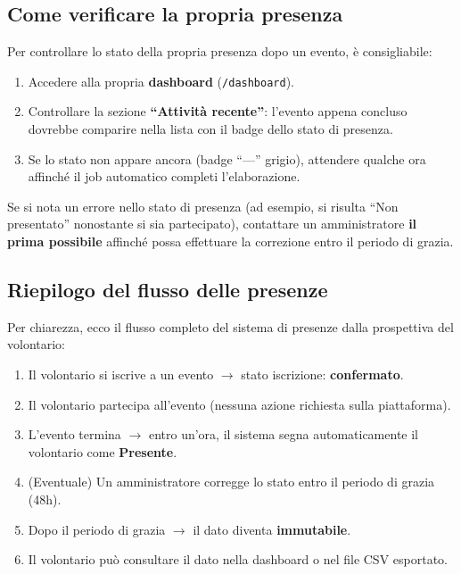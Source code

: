\documentclass[a4paper,11pt,oneside]{book}
\newcommand{\percorso}[1]{\textcolor{namoCyan}{\texttt{#1}}}
\begin{document}
\subsection{Come verificare la propria presenza}

Per controllare lo stato della propria presenza dopo un evento, \`e consigliabile:

\begin{enumerate}[leftmargin=1.5em]
  \item Accedere alla propria \textbf{dashboard} (\percorso{/dashboard}).
  \item Controllare la sezione \textbf{``Attivit\`a recente''}: l'evento appena concluso dovrebbe comparire nella lista con il badge dello stato di presenza.
  \item Se lo stato non appare ancora (badge ``---'' grigio), attendere qualche ora affinch\'e il job automatico completi l'elaborazione.
\end{enumerate}

\begin{tipbox}
Se si nota un errore nello stato di presenza (ad esempio, si risulta ``Non presentato'' nonostante si sia partecipato), contattare un amministratore \textbf{il prima possibile} affinch\'e possa effettuare la correzione entro il periodo di grazia.
\end{tipbox}

\subsection{Riepilogo del flusso delle presenze}

Per chiarezza, ecco il flusso completo del sistema di presenze dalla prospettiva del volontario:

\begin{enumerate}[leftmargin=1.5em]
  \item Il volontario si iscrive a un evento $\rightarrow$ stato iscrizione: \textbf{confermato}.
  \item Il volontario partecipa all'evento (nessuna azione richiesta sulla piattaforma).
  \item L'evento termina $\rightarrow$ entro un'ora, il sistema segna automaticamente il volontario come \textbf{Presente}.
  \item (Eventuale) Un amministratore corregge lo stato entro il periodo di grazia (48h).
  \item Dopo il periodo di grazia $\rightarrow$ il dato diventa \textbf{immutabile}.
  \item Il volontario pu\`o consultare il dato nella dashboard o nel file CSV esportato.
\end{enumerate}
\end{document}
